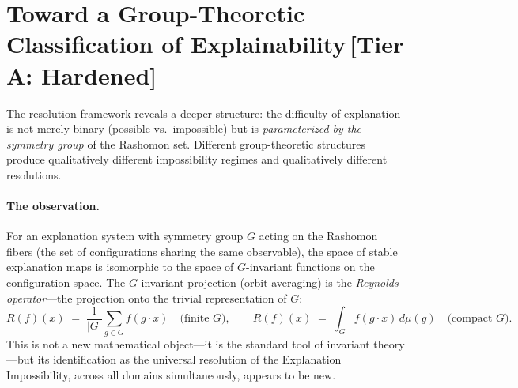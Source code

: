 \documentclass[11pt,a4paper]{article}
\begin{document}
\section{Toward a Group-Theoretic Classification of Explainability\,\textnormal{\normalsize[Tier A: Hardened]}}
\label{sec:group-classification}

The resolution framework reveals a deeper structure: the difficulty of
explanation is not merely binary (possible vs.\ impossible) but is
\emph{parameterized by the symmetry group} of the Rashomon set.
Different group-theoretic structures produce qualitatively different
impossibility regimes and qualitatively different resolutions.

\paragraph{The observation.}
For an explanation system with symmetry group $G$ acting on the Rashomon
fibers (the set of configurations sharing the same observable), the space
of stable explanation maps is isomorphic to the space of $G$-invariant
functions on the configuration space.  The $G$-invariant projection
(orbit averaging) is the \emph{Reynolds operator}---the projection onto
the trivial representation of $G$:
\[
  R(f)(x) \;=\; \frac{1}{|G|} \sum_{g \in G} f(g \cdot x)
  \quad\text{(finite $G$)},
  \qquad
  R(f)(x) \;=\; \int_G f(g \cdot x)\, d\mu(g)
  \quad\text{(compact $G$)}.
\]
This is not a new mathematical object---it is the standard tool of invariant
theory \citep{sturmfels2008algorithms}---but its identification as the
universal resolution of the Explanation Impossibility, across all domains
simultaneously, appears to be new.
\end{document}
